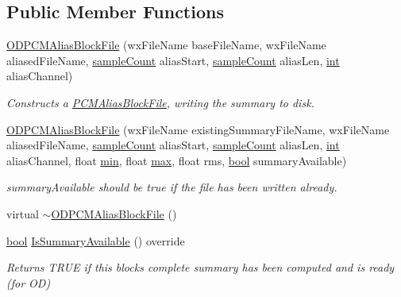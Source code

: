 \subsection*{Public Member Functions}
\begin{DoxyCompactItemize}
\item 
\hyperlink{class_o_d_p_c_m_alias_block_file_a897e40c43be66ae6169c282b0b5ddea6}{O\+D\+P\+C\+M\+Alias\+Block\+File} (wx\+File\+Name base\+File\+Name, wx\+File\+Name aliased\+File\+Name, \hyperlink{include_2audacity_2_types_8h_afa427e1f521ea5ec12d054e8bd4d0f71}{sample\+Count} alias\+Start, \hyperlink{include_2audacity_2_types_8h_afa427e1f521ea5ec12d054e8bd4d0f71}{sample\+Count} alias\+Len, \hyperlink{xmltok_8h_a5a0d4a5641ce434f1d23533f2b2e6653}{int} alias\+Channel)
\begin{DoxyCompactList}\small\item\em Constructs a \hyperlink{class_p_c_m_alias_block_file}{P\+C\+M\+Alias\+Block\+File}, writing the summary to disk. \end{DoxyCompactList}\item 
\hyperlink{class_o_d_p_c_m_alias_block_file_a701414f66e2eeda52c58c118c9b1214c}{O\+D\+P\+C\+M\+Alias\+Block\+File} (wx\+File\+Name existing\+Summary\+File\+Name, wx\+File\+Name aliased\+File\+Name, \hyperlink{include_2audacity_2_types_8h_afa427e1f521ea5ec12d054e8bd4d0f71}{sample\+Count} alias\+Start, \hyperlink{include_2audacity_2_types_8h_afa427e1f521ea5ec12d054e8bd4d0f71}{sample\+Count} alias\+Len, \hyperlink{xmltok_8h_a5a0d4a5641ce434f1d23533f2b2e6653}{int} alias\+Channel, float \hyperlink{_compare_audio_command_8cpp_abd8bbcfabb3ddef2ccaafb9928a37b95}{min}, float \hyperlink{_t_d_stretch_8cpp_ac39d9cef6a5e030ba8d9e11121054268}{max}, float rms, \hyperlink{mac_2config_2i386_2lib-src_2libsoxr_2soxr-config_8h_abb452686968e48b67397da5f97445f5b}{bool} summary\+Available)
\begin{DoxyCompactList}\small\item\em summary\+Available should be true if the file has been written already. \end{DoxyCompactList}\item 
virtual \hyperlink{class_o_d_p_c_m_alias_block_file_afc726191a4b8d805fed7693992a8f003}{$\sim$\+O\+D\+P\+C\+M\+Alias\+Block\+File} ()
\item 
\hyperlink{mac_2config_2i386_2lib-src_2libsoxr_2soxr-config_8h_abb452686968e48b67397da5f97445f5b}{bool} \hyperlink{class_o_d_p_c_m_alias_block_file_a181b7a8b1214e460d9852095468279e2}{Is\+Summary\+Available} () override
\begin{DoxyCompactList}\small\item\em Returns T\+R\+UE if this block\textquotesingle{}s complete summary has been computed and is ready (for OD) \end{DoxyCompactList}\item 

\end{DoxyCompactItemize}
